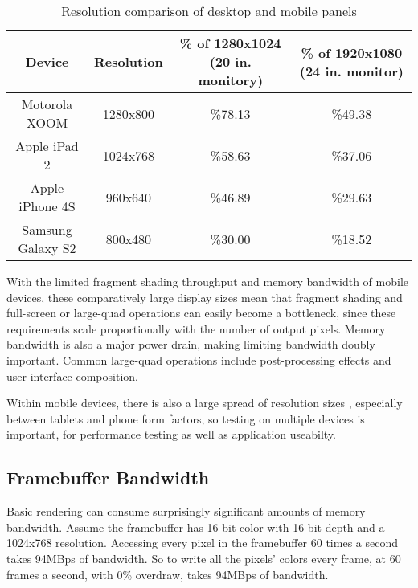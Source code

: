 \begin{table}[htb]\centering \begin{tabular}{|c|c|c|c|} 
\hline \small{Device} & \small{Resolution} & \small{\% of 1280x1024 (20 in. monitory)} & \small{\% of 1920x1080 (24 in. monitor)}  \\ \hline 
\small{Motorola XOOM} & \small{1280x800} & \small{\%78.13} & \small{\%49.38}\\ 
\hline \small{Apple iPad 2} & \small{1024x768} & \small{\%58.63} & \small{\%37.06}\\ 
\hline \small{Apple iPhone 4S} & \small{960x640} & \small{\%46.89} & \small{\%29.63}\\
\hline \small{Samsung Galaxy S2} & \small{800x480} & \small{\%30.00} & \small{\%18.52}\\ \hline
\end{tabular} 
\caption{Resolution comparison of desktop and mobile panels} 
\label{JonMcCaffrey:resolutions} \end{table}


With the limited fragment shading throughput and memory bandwidth of mobile
devices, these comparatively large display sizes mean that fragment shading and
full-screen or large-quad operations can easily become a bottleneck, since
these requirements scale proportionally with the number of output pixels.
Memory bandwidth is also a major power drain, making limiting bandwidth doubly
important.  Common large-quad operations include post-processing effects and user-interface composition.

Within mobile devices, there is also a large spread of resolution sizes
, especially between tablets and phone form factors, so testing
on multiple devices is important, for performance testing as well as
application useabilty.

\subsection{Framebuffer Bandwidth}\label{Jon-McCaffrey-Framebuffer-Bandwidth}

Basic rendering can consume surprisingly significant amounts of memory
bandwidth.  Assume the framebuffer has 16-bit color with 16-bit depth
\cite{Google11} and a 1024x768 resolution.  Accessing every pixel in the
framebuffer 60 times a second takes 94MBps of bandwidth.  So to write all the
pixels' colors every frame, at 60 frames a second, with 0\%
overdraw, takes 94MBps of bandwidth.

